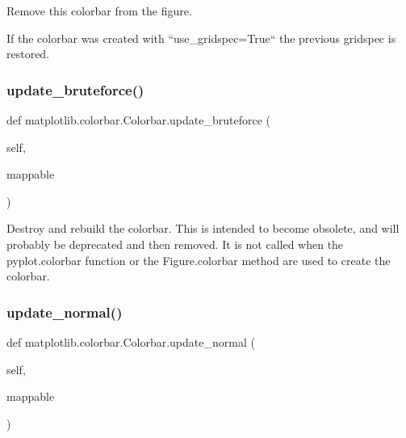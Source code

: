 \begin{DoxyVerb}Remove this colorbar from the figure.

If the colorbar was created with ``use_gridspec=True`` the previous
gridspec is restored.
\end{DoxyVerb}
 \mbox{\label{classmatplotlib_1_1colorbar_1_1Colorbar_a6526f6449ae2d0d5164c91b64067c60c}} 
\subsubsection{\texorpdfstring{update\+\_\+bruteforce()}{update\_bruteforce()}}
{\footnotesize\ttfamily def matplotlib.\+colorbar.\+Colorbar.\+update\+\_\+bruteforce (\begin{DoxyParamCaption}\item[{}]{self,  }\item[{}]{mappable }\end{DoxyParamCaption})}

\begin{DoxyVerb}Destroy and rebuild the colorbar.  This is
intended to become obsolete, and will probably be
deprecated and then removed.  It is not called when
the pyplot.colorbar function or the Figure.colorbar
method are used to create the colorbar.
\end{DoxyVerb}
 \mbox{\label{classmatplotlib_1_1colorbar_1_1Colorbar_a9659e2def6ae41ffce0034b96355529a}} 
\subsubsection{\texorpdfstring{update\+\_\+normal()}{update\_normal()}}
{\footnotesize\ttfamily def matplotlib.\+colorbar.\+Colorbar.\+update\+\_\+normal (\begin{DoxyParamCaption}\item[{}]{self,  }\item[{}]{mappable }\end{DoxyParamCaption})}

